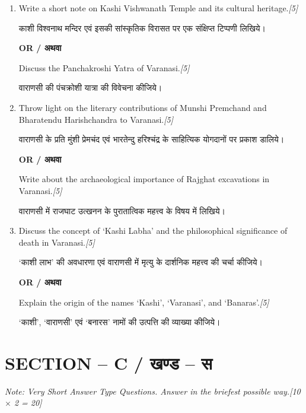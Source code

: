\documentclass[11pt,a4paper]{article}
\newcommand{\pts}[1]{\hfill \textit{[#1]}}
\begin{document}
\begin{enumerate}[label=\textbf{\arabic*.},leftmargin=*,start=4,itemsep=10pt]

  \item Write a short note on Kashi Vishwanath Temple and its cultural heritage.\pts{5}
  
  काशी विश्वनाथ मन्दिर एवं इसकी सांस्कृतिक विरासत पर एक संक्षिप्त टिप्पणी लिखिये।

  \begin{center}\textbf{OR / अथवा}\end{center}

  Discuss the Panchakroshi Yatra of Varanasi.\pts{5}
  
  वाराणसी की पंचक्रोशी यात्रा की विवेचना कीजिये।

  \item Throw light on the literary contributions of Munshi Premchand and Bharatendu Harishchandra to Varanasi.\pts{5}
  
  वाराणसी के प्रति मुंशी प्रेमचंद एवं भारतेन्दु हरिश्चंद्र के साहित्यिक योगदानों पर प्रकाश डालिये।

  \begin{center}\textbf{OR / अथवा}\end{center}

  Write about the archaeological importance of Rajghat excavations in Varanasi.\pts{5}
  
  वाराणसी में राजघाट उत्खनन के पुरातात्विक महत्त्व के विषय में लिखिये।

  \item Discuss the concept of `Kashi Labha' and the philosophical significance of death in Varanasi.\pts{5}
  
  `काशी लाभ' की अवधारणा एवं वाराणसी में मृत्यु के दार्शनिक महत्त्व की चर्चा कीजिये।

  \begin{center}\textbf{OR / अथवा}\end{center}

  Explain the origin of the names `Kashi', `Varanasi', and `Banaras'.\pts{5}
  
  `काशी', `वाराणसी' एवं `बनारस' नामों की उत्पत्ति की व्याख्या कीजिये।

\end{enumerate}

\bigskip

\section*{SECTION -- C / खण्ड -- स}
\noindent \textit{Note: Very Short Answer Type Questions. Answer in the briefest possible way.}\pts{10 $\times$ 2 = 20}
\end{document}
